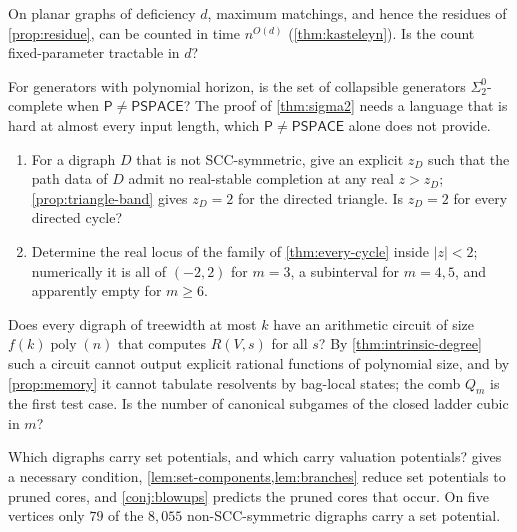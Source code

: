 \documentclass[final]{siamart0516}
\numberwithin{theorem}{section}
\numberwithin{equation}{section}
\theoremstyle{siamnonum}
\theoremstyle{plain}
\newcommand{\poly}{\operatorname{poly}}
\newcommand{\cls}[1]{\mathsf{#1}}
\newcommand{\PSPACE}{\cls{PSPACE}}
\newcommand{\Pclass}{\cls{P}}
\begin{document}
\begin{problem}\label{prob:fpt-deficiency}
On planar graphs of deficiency $d$, maximum matchings, and hence the residues of \cref{prop:residue}, can be counted in time $n^{O(d)}$ (\cref{thm:kasteleyn}). Is the count fixed-parameter tractable in $d$?
\end{problem}

\begin{problem}\label{prob:sigma2}
For generators with polynomial horizon, is the set of collapsible generators $\Sigma^0_2$-complete when $\Pclass\neq\PSPACE$? The proof of \cref{thm:sigma2} needs a language that is hard at almost every input length, which $\Pclass\neq\PSPACE$ alone does not provide.
\end{problem}

\begin{problem}\label{prob:band}
\begin{enumerate}[label=\textup{(\alph*)}]
\item For a digraph $D$ that is not SCC-symmetric, give an explicit $z_D$ such that the path data of $D$ admit no real-stable completion at any real $z>z_D$; \cref{prop:triangle-band} gives $z_D=2$ for the directed triangle. Is $z_D=2$ for every directed cycle?
\item Determine the real locus of the family of \cref{thm:every-cycle} inside $|z|<2$; numerically it is all of $(-2,2)$ for $m=3$, a subinterval for $m=4,5$, and apparently empty for $m\ge6$.
\end{enumerate}
\end{problem}

\begin{problem}\label{prob:tw-circuits}
Does every digraph of treewidth at most $k$ have an arithmetic circuit of size $f(k)\poly(n)$ that computes $R(V,s)$ for all $s$? By \cref{thm:intrinsic-degree} such a circuit cannot output explicit rational functions of polynomial size, and by \cref{prop:memory} it cannot tabulate resolvents by bag-local states; the comb $Q_m$ is the first test case. Is the number of canonical subgames of the closed ladder cubic in $m$?
\end{problem}

\begin{problem}\label{prob:setpot}
Which digraphs carry set potentials, and which carry valuation potentials?  gives a necessary condition, \cref{lem:set-components,lem:branches} reduce set potentials to pruned cores, and \cref{conj:blowups} predicts the pruned cores that occur. On five vertices only $79$ of the $8{,}055$ non-SCC-symmetric digraphs carry a set potential.
\end{problem}
\end{document}
